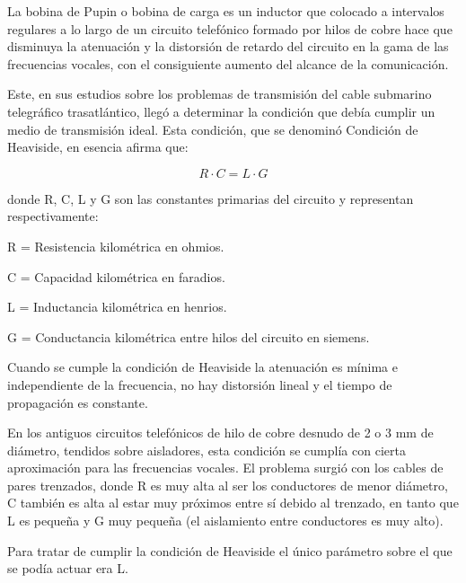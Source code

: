 \documentclass[a4paper]{article}
\begin{document}
La bobina de Pupin o bobina de carga es un inductor que colocado a
intervalos regulares a lo largo de un circuito telefónico formado por
hilos de cobre hace que disminuya la atenuación y la distorsión de
retardo del circuito en la gama de las frecuencias vocales, con el
consiguiente aumento del alcance de la comunicación.

\noindent{}

Este, en sus estudios sobre los problemas de transmisión del cable
submarino telegráfico trasatlántico, llegó a determinar la condición que
debía cumplir un medio de transmisión ideal. Esta condición, que se
denominó Condición de Heaviside, en esencia afirma que:

$$R \cdot C = L \cdot G$$

donde R, C, L y G son las constantes primarias del circuito y
representan respectivamente:

R = Resistencia kilométrica en ohmios.

C = Capacidad kilométrica en faradios.

L = Inductancia kilométrica en henrios.

G = Conductancia kilométrica entre hilos del circuito en siemens.

Cuando se cumple la condición de Heaviside la atenuación es mínima e
independiente de la frecuencia, no hay distorsión lineal y el tiempo de
propagación es constante.

En los antiguos circuitos telefónicos de hilo de cobre desnudo de 2 o 3
mm de diámetro, tendidos sobre aisladores, esta condición se cumplía con
cierta aproximación para las frecuencias vocales. El problema surgió con
los cables de pares trenzados, donde R es muy alta al ser los
conductores de menor diámetro, C también es alta al estar muy próximos
entre sí debido al trenzado, en tanto que L es pequeña y G muy pequeña
(el aislamiento entre conductores es muy alto).

Para tratar de cumplir la condición de Heaviside el único parámetro
sobre el que se podía actuar era L.
\end{document}
